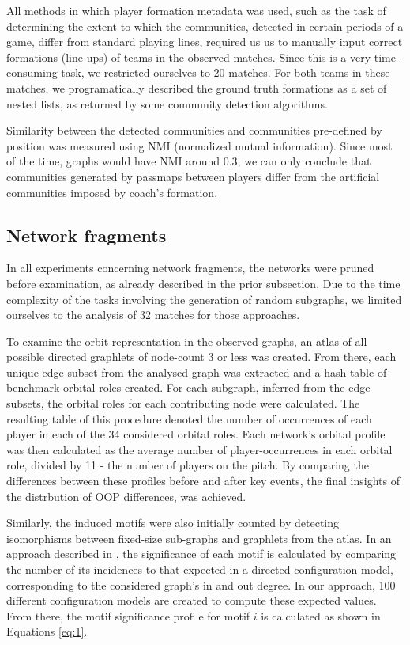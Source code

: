 \documentclass[9pt,twocolumn,twoside]{pnas-report}
\begin{document}
{All methods in which player formation metadata was used, such as the task of determining the extent to which the communities, detected in certain periods of a game, differ from standard playing lines, required us us to manually input correct formations (line-ups) of teams in the observed matches. Since this is a very time-consuming task, we restricted ourselves to 20 matches. For both teams in these matches, we programatically described the ground truth formations as a set of nested lists, as returned by some community detection algorithms. 


Similarity between the detected communities and communities pre-defined by position was measured using NMI (normalized mutual information). Since most of the time, graphs would have NMI around 0.3, we can only conclude that communities generated by passmaps between players differ from the artificial communities imposed by coach's formation.

 
\subsection*{Network fragments}
In all experiments concerning network fragments, the networks were pruned before examination, as already described in the prior subsection. Due to the time complexity of the tasks involving the generation of random subgraphs, we limited ourselves to the analysis of 32 matches for those approaches.

To examine the orbit-representation in the observed graphs, an atlas of all possible directed graphlets of node-count 3 or less was created. From there, each unique edge subset from the analysed graph was extracted and a hash table of benchmark orbital roles created. For each subgraph, inferred from the edge subsets, the orbital roles for each contributing node were calculated. The resulting table of this procedure denoted the number of occurrences of each player in each of the 34 considered orbital roles. Each network's orbital profile was then calculated as the average number of player-occurrences in each orbital role, divided by 11 - the number of players on the pitch. By comparing the differences between these profiles before and after key events, the final insights of the distrbution of OOP differences, was achieved.

Similarly, the induced motifs were also initially counted by detecting isomorphisms between fixed-size sub-graphs and graphlets from the atlas. In an approach described in \cite{przulj}, the significance of each motif is calculated by comparing the number of its incidences to that expected in a directed configuration model, corresponding to the considered graph's in and out degree. In our approach, 100 different configuration models are created to compute these expected values. From there, the motif significance profile for motif $i$ is calculated as shown in Equations \ref{eq:1}.


}
\end{document}
